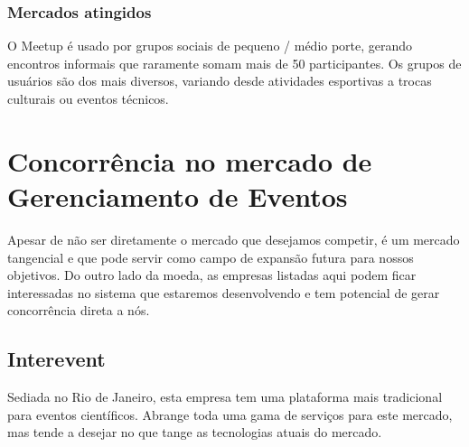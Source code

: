 \documentclass[12pt,a4paper,twoside,hyphens,english,brazil]{abntex2}
\begin{document}
\subsubsection*{Mercados atingidos}
O Meetup é usado por grupos sociais de pequeno / médio porte, gerando encontros informais que raramente somam mais de 50 participantes. Os grupos de usuários são dos mais diversos, variando desde atividades esportivas a trocas culturais ou eventos técnicos.


\section{Concorrência no mercado de Gerenciamento de Eventos} \label{sec:sistemas:gerenciamento}
Apesar de não ser diretamente o mercado que desejamos competir, é um mercado tangencial e que pode servir como campo de expansão futura para nossos objetivos. Do outro lado da moeda, as empresas listadas aqui podem ficar interessadas no sistema que estaremos desenvolvendo e tem potencial de gerar concorrência direta a nós.

\subsection{Interevent}
Sediada no Rio de Janeiro, esta empresa tem uma plataforma mais tradicional para eventos científicos. Abrange toda uma gama de serviços para este mercado, mas tende a desejar no que tange as tecnologias atuais do mercado.
\end{document}
